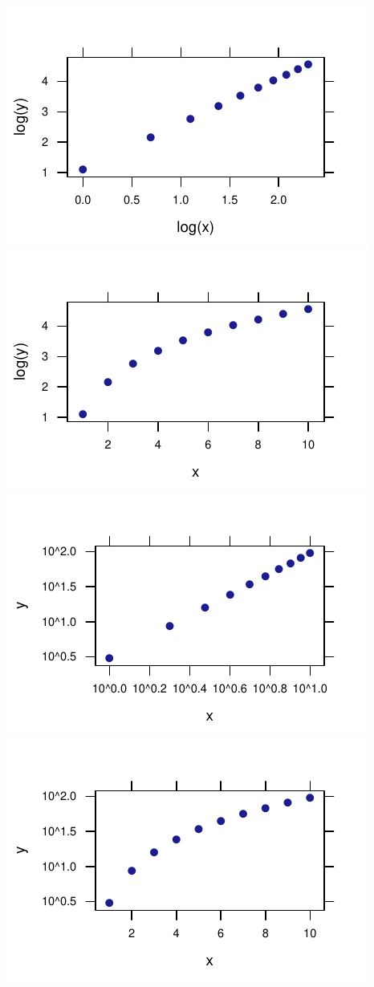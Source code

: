 \documentclass[twoside]{book}\usepackage[]{graphicx}\usepackage[]{xcolor}
\makeatletter
\def\maxwidth{ %
  \ifdim\Gin@nat@width>\linewidth
    \linewidth
  \else
    \Gin@nat@width
  \fi
}
\newenvironment{knitrout}{}{} %
\makeatother
\begin{document}
\begin{knitrout}
{\centering \includegraphics[width=\maxwidth]{figures/fig-unnamed-chunk-202-1} 
\includegraphics[width=\maxwidth]{figures/fig-unnamed-chunk-202-2} 
\includegraphics[width=\maxwidth]{figures/fig-unnamed-chunk-202-3} 
\includegraphics[width=\maxwidth]{figures/fig-unnamed-chunk-202-4} 

}
\end{knitrout}
\end{document}
